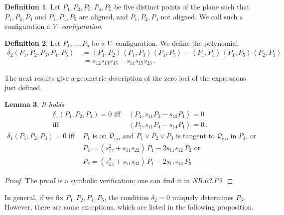\documentclass[a4paper, 11pt, reqno]{amsart}
\theoremstyle{plain}
\newtheorem{lemma}{Lemma}[section]
\theoremstyle{definition}
\newtheorem{definition}[lemma]{Definition}
\newcommand{\nb}[2]{\textsl{{NB}.{#1}.{#2}}}
\newcommand{\iso}{\mathcal{Q}_{\mathrm{iso}}}
\newcommand{\scl}[2]{\left\langle {#1}, {#2} \right\rangle}
\begin{document}
\begin{definition}
\label{definition:Vconf}
Let $P_1, P_2, P_3, P_4, P_5$ be five distinct points of the plane
such that $P_1, P_2, P_3$ and $P_1, P_4, P_5$ are aligned, and
$P_1,P_2,P_4$ not aligned.
We call such a configuration a \emph{$V$- configuration}.
\end{definition}

\begin{definition}
Let $P_1, \dots, P_5$ be a $V$- configuration.
We define the polynomial
%
\begin{align*}
  \delta_2(P_1, P_2, P_3, P_4, P_5) &:=
  \scl{P_1}{P_2} \scl{P_1}{P_3} \scl{P_4}{P_5} -
  \scl{P_1}{P_4} \scl{P_1}{P_5} \scl{P_2}{P_3} \\
  &\phantom{:}= s_{12}s_{13}s_{45}-s_{14}s_{15} s_{23} \,.
\end{align*}
%
\end{definition}

The next results give a geometric description of the zero loci of the expressions just defined.
\begin{lemma}
\label{lemma:characteristics_d1_d2}
It holds
%
\begin{align}
\label{lemma_delta_case1}
  \delta_1(P_1, P_2, P_4) = 0 \mbox{ iff } &\scl{P_4}{s_{11}P_2-s_{12}P_1} = 0\\
  \mbox{iff } &\scl{P_2}{s_{11}P_4-s_{14}P_1} = 0 \,. \nonumber
\end{align}
%
\begin{align}
\label{lemma_delta_case2}
  \overline{\delta}_1(P_1, P_2, P_3) = 0 \mbox{ iff } &
  P_1 \mbox{ is on~$\iso$ and } P_1 \vee P_2 \vee P_3 \mbox{ is tangent to~$\iso$ in $P_1$, or} \\
  & P_3 = (s_{12}^2+s_{11}s_{22}) \, P_1 - 2s_{11}s_{12} \, P_2 \mbox{ or} \nonumber \\
  & P_2 = (s_{13}^2+s_{11}s_{33}) \, P_1 - 2s_{11}s_{13} \, P_3 \nonumber
\end{align}
%
\end{lemma}
\begin{proof}
 The proof is a symbolic verification; one can find it in \nb{03}{F3}.
\end{proof}

In general, if we fix $P_1,P_2,P_4,P_5$, the condition
$\delta_2=0$ uniquely determines $P_3$. However, there are some exceptions, which are listed in the following proposition.
\end{document}
